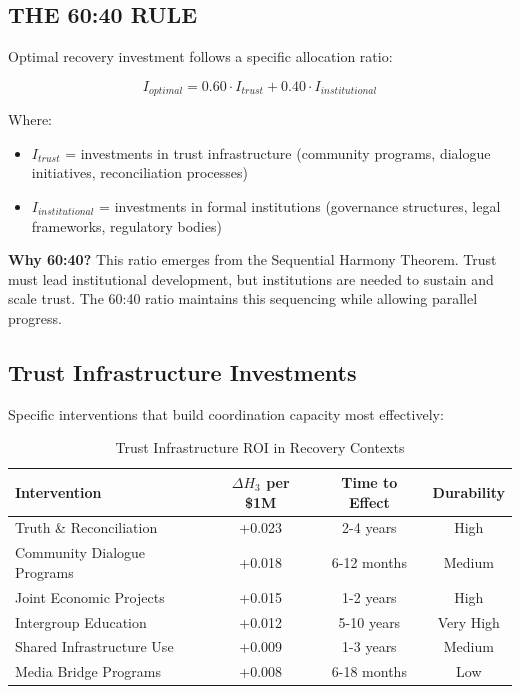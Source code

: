 \documentclass[11pt,letterpaper]{article}
\begin{document}
\subsection{THE 60:40 RULE}

Optimal recovery investment follows a specific allocation ratio:

\begin{equation}
I_{optimal} = 0.60 \cdot I_{trust} + 0.40 \cdot I_{institutional}
\label{eq:allocation}
\end{equation}

Where:
\begin{itemize}
\item $I_{trust}$ = investments in trust infrastructure (community programs, dialogue initiatives, reconciliation processes)
\item $I_{institutional}$ = investments in formal institutions (governance structures, legal frameworks, regulatory bodies)
\end{itemize}

\textbf{Why 60:40?} This ratio emerges from the Sequential Harmony Theorem. Trust must lead institutional development, but institutions are needed to sustain and scale trust. The 60:40 ratio maintains this sequencing while allowing parallel progress.

\subsection{Trust Infrastructure Investments}

Specific interventions that build coordination capacity most effectively:

\begin{table}[H]
\centering
\caption{Trust Infrastructure ROI in Recovery Contexts}
\begin{tabular}{lccc}
\toprule
\textbf{Intervention} & \textbf{$\Delta H_3$ per \$1M} & \textbf{Time to Effect} & \textbf{Durability} \\
\midrule
Truth \& Reconciliation & +0.023 & 2-4 years & High \\
Community Dialogue Programs & +0.018 & 6-12 months & Medium \\
Joint Economic Projects & +0.015 & 1-2 years & High \\
Intergroup Education & +0.012 & 5-10 years & Very High \\
Shared Infrastructure Use & +0.009 & 1-3 years & Medium \\
Media Bridge Programs & +0.008 & 6-18 months & Low \\
\bottomrule
\end{tabular}
\label{tab:trust_investments}
\end{table}
\end{document}

